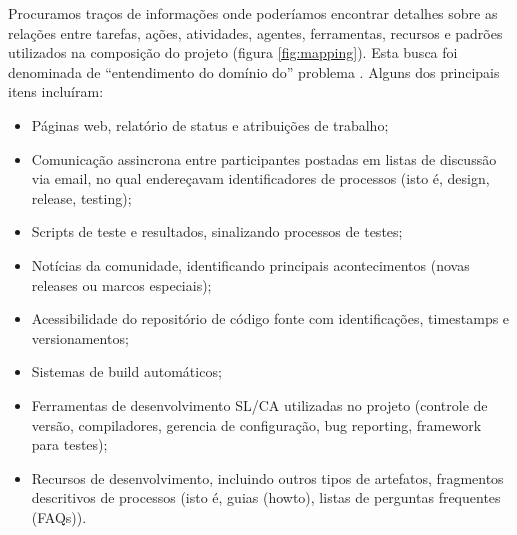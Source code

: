 Procuramos traços de informações onde poderíamos encontrar detalhes sobre as relações entre tarefas, ações, atividades, agentes, ferramentas, recursos e padrões utilizados na composição do projeto (figura \ref{fig:mapping}). Esta busca foi denominada de ``entendimento do domínio do'' problema \cite{experience}. Alguns dos principais itens incluíram:


\begin{itemize}
 \item Páginas web, relatório de status e atribuições de trabalho;
 \item Comunicação assincrona entre participantes postadas em listas de discussão via email, no qual endereçavam identificadores de processos (isto é, design, release, testing);
 \item Scripts de teste e resultados, sinalizando processos de testes;
 \item Notícias da comunidade, identificando principais acontecimentos (novas releases ou marcos especiais);
 \item Acessibilidade do repositório de código fonte com identificações, timestamps e versionamentos;
 \item Sistemas de build automáticos;
 \item Ferramentas de desenvolvimento SL/CA utilizadas no projeto (controle de versão, compiladores, gerencia de configuração, bug reporting, framework para testes);
 \item Recursos de desenvolvimento, incluindo outros tipos de artefatos, fragmentos descritivos de processos (isto é, guias (howto), listas de perguntas frequentes (FAQs)).
\end{itemize}

